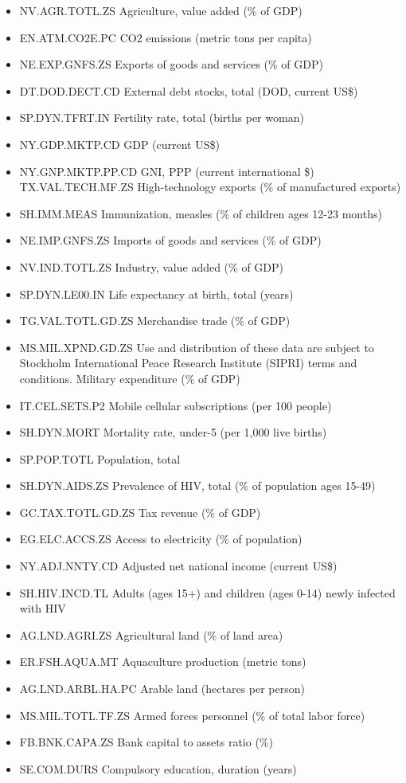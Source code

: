 \begin{itemize}
\tightlist
\item
  NV.AGR.TOTL.ZS Agriculture, value added (\% of GDP)
\item
  EN.ATM.CO2E.PC CO2 emissions (metric tons per capita)
\item
  NE.EXP.GNFS.ZS Exports of goods and services (\% of GDP)
\item
  DT.DOD.DECT.CD External debt stocks, total (DOD, current US\$)
\item
  SP.DYN.TFRT.IN Fertility rate, total (births per woman)
\item
  NY.GDP.MKTP.CD GDP (current US\$)
\item
  NY.GNP.MKTP.PP.CD GNI, PPP (current international \$)
  TX.VAL.TECH.MF.ZS High-technology exports (\% of manufactured exports)
\item
  SH.IMM.MEAS Immunization, measles (\% of children ages 12-23 months)
\item
  NE.IMP.GNFS.ZS Imports of goods and services (\% of GDP)
\item
  NV.IND.TOTL.ZS Industry, value added (\% of GDP)
\item
  SP.DYN.LE00.IN Life expectancy at birth, total (years)
\item
  TG.VAL.TOTL.GD.ZS Merchandise trade (\% of GDP)
\item
  MS.MIL.XPND.GD.ZS Use and distribution of these data are subject to
  Stockholm International Peace Research Institute (SIPRI) terms and
  conditions. Military expenditure (\% of GDP)
\item
  IT.CEL.SETS.P2 Mobile cellular subscriptions (per 100 people)
\item
  SH.DYN.MORT Mortality rate, under-5 (per 1,000 live births)
\item
  SP.POP.TOTL Population, total
\item
  SH.DYN.AIDS.ZS Prevalence of HIV, total (\% of population ages 15-49)
\item
  GC.TAX.TOTL.GD.ZS Tax revenue (\% of GDP)
\item
  EG.ELC.ACCS.ZS Access to electricity (\% of population)
\item
  NY.ADJ.NNTY.CD Adjusted net national income (current US\$)
\item
  SH.HIV.INCD.TL Adults (ages 15+) and children (ages 0-14) newly
  infected with HIV
\item
  AG.LND.AGRI.ZS Agricultural land (\% of land area)
\item
  ER.FSH.AQUA.MT Aquaculture production (metric tons)
\item
  AG.LND.ARBL.HA.PC Arable land (hectares per person)
\item
  MS.MIL.TOTL.TF.ZS Armed forces personnel (\% of total labor force)
\item
  FB.BNK.CAPA.ZS Bank capital to assets ratio (\%)
\item
  SE.COM.DURS Compulsory education, duration (years)
\end{itemize}

